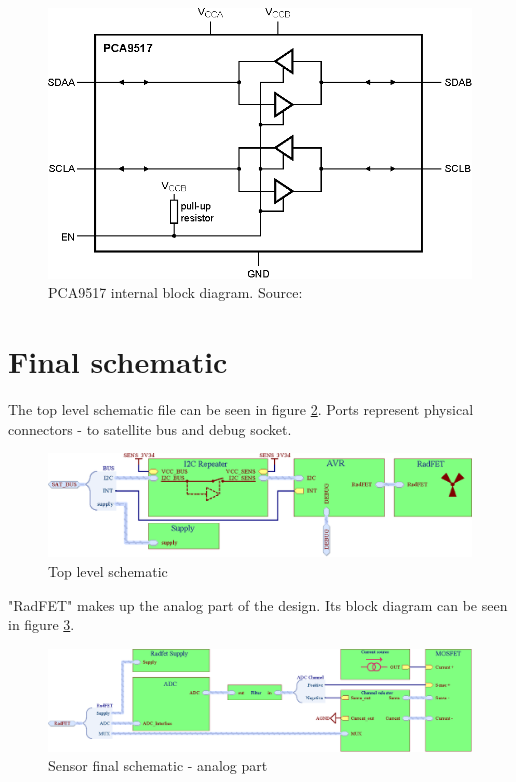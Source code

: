         \begin{figure}[H]
            \centering
            \includegraphics[width=0.7\paperwidth]{img/06/PCA9517.eps}
            \caption{PCA9517 internal block diagram. Source: \cite{PCA9517_datasheet}}
            \label{PCA9517}
        \end{figure}


\section{Final schematic}
    The top level schematic file can be seen in figure \ref{top_level_schematic}. Ports represent physical connectors - to satellite bus and debug socket.

    \begin{figure}[H]
        \centering
        \includegraphics[width=0.8\paperwidth]{img/06/final_schematic_top.eps}
        \caption{Top level schematic}
        \label{top_level_schematic}
    \end{figure}

    "RadFET" makes up the analog part of the design. Its block diagram can be seen in figure \ref{analog_schematic}.

    \begin{figure}[H]
        \centering
        \includegraphics[width=0.8\paperwidth]{img/06/final_schematic_radfet.eps}
        \caption{Sensor final schematic - analog part}
        \label{analog_schematic}
    \end{figure}


